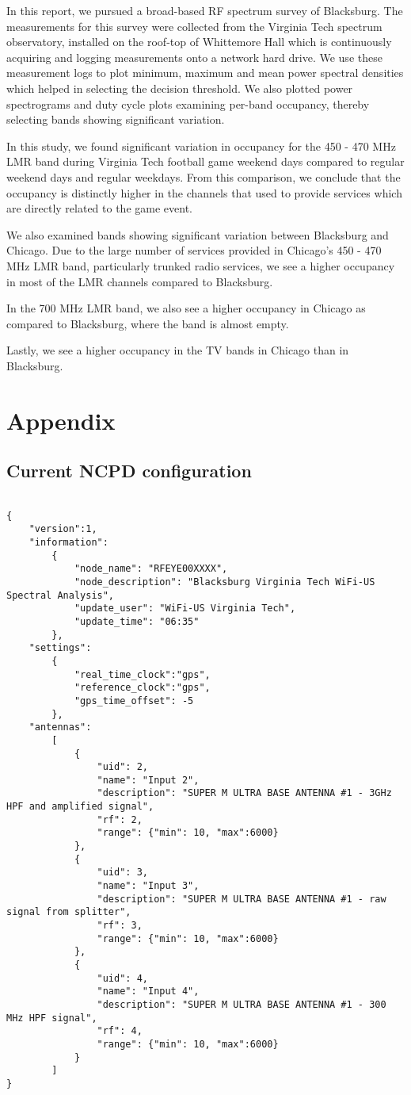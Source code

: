 \documentclass[12pt,sts]{report}
\begin{document}
In this report, we pursued a broad-based RF spectrum survey of Blacksburg. The measurements for this survey were collected from the Virginia Tech spectrum observatory, installed on the roof-top of Whittemore Hall which is continuously acquiring and logging measurements onto a network hard drive. We use these measurement logs to plot minimum, maximum and mean power spectral densities which helped in selecting the decision threshold. We also plotted power spectrograms and duty cycle plots examining per-band occupancy, thereby selecting bands showing significant variation.

In this study, we found significant variation in occupancy for the 450 - 470 MHz LMR band during Virginia Tech football game weekend days compared to regular weekend days and regular weekdays. From this comparison, we conclude that the occupancy is distinctly higher in the channels that used to provide services which are directly related to the game event. 

We also examined bands showing significant variation between Blacksburg and Chicago. Due to the large number of services provided in Chicago's 450 - 470 MHz LMR band, particularly trunked radio services, we see a higher occupancy in most of the LMR channels compared to Blacksburg. 

In the 700 MHz LMR band, we also see a higher occupancy in Chicago as compared to Blacksburg, where the band is almost empty.

Lastly, we see a higher occupancy in the TV bands in Chicago than in Blacksburg.

\section*{Appendix}

\subsection*{Current NCPD configuration}

\begin{verbatim}

{
	"version":1,
	"information":
		{
			"node_name": "RFEYE00XXXX",
			"node_description": "Blacksburg Virginia Tech WiFi-US Spectral Analysis",
			"update_user": "WiFi-US Virginia Tech",
			"update_time": "06:35"
		},
	"settings":
		{
			"real_time_clock":"gps",
			"reference_clock":"gps",
			"gps_time_offset": -5
		},
	"antennas":
		[
			{
				"uid": 2,
				"name": "Input 2",
				"description": "SUPER M ULTRA BASE ANTENNA #1 - 3GHz HPF and amplified signal",
				"rf": 2,
				"range": {"min": 10, "max":6000}
			},
			{
				"uid": 3,
				"name": "Input 3",
				"description": "SUPER M ULTRA BASE ANTENNA #1 - raw signal from splitter",
				"rf": 3,
				"range": {"min": 10, "max":6000}
			},
			{
				"uid": 4,
				"name": "Input 4",
				"description": "SUPER M ULTRA BASE ANTENNA #1 - 300 MHz HPF signal",
				"rf": 4,
				"range": {"min": 10, "max":6000}
			}
		]
}

\end{verbatim}
\pagebreak
\end{document}
